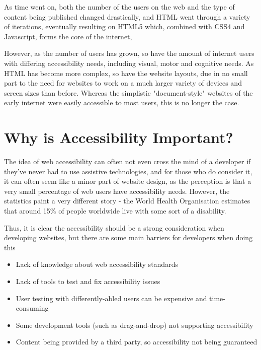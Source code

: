 \documentclass[ %
                    author={Aleena Baig},
                supervisor={Dr Simon Lock},
                    degree={BSc},
                     title={On Making Web Accessible Graphs},
                  subtitle={},
                      year={2019} ]{dissertation}
\begin{document}
As time went on, both the number of the users on the web and the type of content being published changed drastically, and HTML went through a variety of iterations, eventually resulting on HTML5 which, combined with CSS4 and Javascript, forms the core of the internet,

However, as the number of users has grown, so have the amount of internet users with differing accessibility needs, including visual, motor and cognitive needs. As HTML has become more complex, so have the website layouts, due in no small part to the need for websites to work on a much larger variety of devices and screen sizes than before. Whereas the simplistic "document-style" websites of the early internet were easily accessible to most users, this is no longer the case.


\section{Why is Accessibility Important?}

The idea of web accessibility can often not even cross the mind of a developer if they've never had to use assistive technologies, and for those who do consider it, it can often seem like a minor part of website design, as the perception is that a very small percentage of web users have accessibility needs.
However, the statistics paint a very different story - the World Health Organisation estimates that around 15\% of people worldwide live with some sort of a disability. \cite{WHOdisability}

Thus, it is clear the accessibility should be a strong consideration when developing websites, but there are some main barriers for developers when doing this

\begin{itemize}
    \item Lack of knowledge about web accessibility standards
    \item Lack of tools to test and fix accessibility issues
    \item User testing with differently-abled users can be expensive and time-consuming
    \item Some development tools (such as drag-and-drop) not supporting accessibility
    \item Content being provided by a third party, so accessibility not being guaranteed
\end{itemize}
\end{document}
